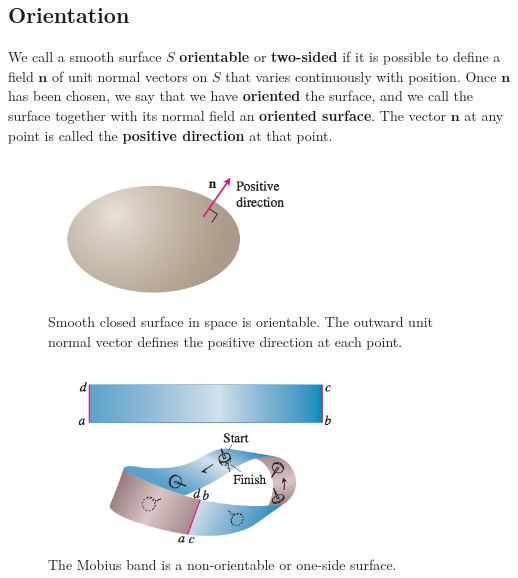 \documentclass[a4paper,12pt]{article}
\begin{document}
\begin{CJK}{UTF8}{gbsn}
\subsection{Orientation}
We call a smooth surface $S$ \textbf{orientable} or \textbf{two-sided} if it is possible to 
define a field $\bm{n}$ of unit normal vectors on $S$ that varies 
continuously with position. Once $\bm{n}$ has been chosen, we say 
that we have \textbf{oriented } the surface, and we call the surface together 
with its normal field an \textbf{oriented surface}. The vector $\bm{n}$ 
at any point is called the \textbf{positive direction} at that point.
\begin{figure}[htbp]
    \centering
    \includegraphics[height=0.5\textwidth, width=0.6\textwidth]{surface4.png}
    \caption{Smooth closed surface in space is orientable. The outward unit normal
    vector defines the positive direction at each point.}
    \label{fig:fig6}
\end{figure}
\begin{figure}[htbp]
    \centering
    \includegraphics[height=0.5\textwidth, width=0.7\textwidth]{surface5.png}
    \caption{The Mobius band is a non-orientable or one-side surface.}
    \label{fig:fig7}
\end{figure}

\end{CJK}
\end{document}
